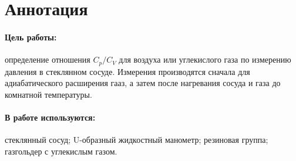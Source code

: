 \documentclass[a4paper,12pt]{report}
\begin{document}
    
    \newpage
    \pagestyle{fancy}

    \fancyhead{}
    \fancyfoot{}
    \fancyhead[L]{\rightmark}
    \fancyhead[R]{\thepage}

    
    \section*{Аннотация}
        \paragraph*{Цель работы: } определение отношения $C_p/C_V$ для воздуха или углекислого газа по измерению давления в стеклянном сосуде. Измерения производятся сначала для адиабатического расширения гааз, а затем после нагревания сосуда и газа до комнатной температуры.
        \paragraph*{В работе используются:} стеклянный сосуд; U-образный жидкостный манометр; резиновая группа; газгольдер с углекислым газом.
    
\end{document}
